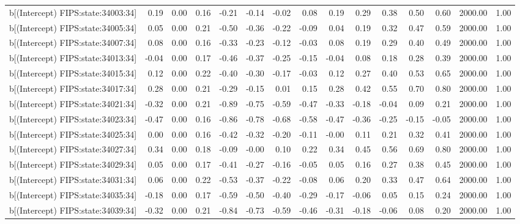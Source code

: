 \begin{table}[ht]
\begin{tabular}{rrrrrrrrrrrrrrr}
  b[(Intercept) FIPS:state:34003:34] & 0.19 & 0.00 & 0.16 & -0.21 & -0.14 & -0.02 & 0.08 & 0.19 & 0.29 & 0.38 & 0.50 & 0.60 & 2000.00 & 1.00 \\ 
  b[(Intercept) FIPS:state:34005:34] & 0.05 & 0.00 & 0.21 & -0.50 & -0.36 & -0.22 & -0.09 & 0.04 & 0.19 & 0.32 & 0.47 & 0.59 & 2000.00 & 1.00 \\ 
  b[(Intercept) FIPS:state:34007:34] & 0.08 & 0.00 & 0.16 & -0.33 & -0.23 & -0.12 & -0.03 & 0.08 & 0.19 & 0.29 & 0.40 & 0.49 & 2000.00 & 1.00 \\ 
  b[(Intercept) FIPS:state:34013:34] & -0.04 & 0.00 & 0.17 & -0.46 & -0.37 & -0.25 & -0.15 & -0.04 & 0.08 & 0.18 & 0.28 & 0.39 & 2000.00 & 1.00 \\ 
  b[(Intercept) FIPS:state:34015:34] & 0.12 & 0.00 & 0.22 & -0.40 & -0.30 & -0.17 & -0.03 & 0.12 & 0.27 & 0.40 & 0.53 & 0.65 & 2000.00 & 1.00 \\ 
  b[(Intercept) FIPS:state:34017:34] & 0.28 & 0.00 & 0.21 & -0.29 & -0.15 & 0.01 & 0.15 & 0.28 & 0.42 & 0.55 & 0.70 & 0.80 & 2000.00 & 1.00 \\ 
  b[(Intercept) FIPS:state:34021:34] & -0.32 & 0.00 & 0.21 & -0.89 & -0.75 & -0.59 & -0.47 & -0.33 & -0.18 & -0.04 & 0.09 & 0.21 & 2000.00 & 1.00 \\ 
  b[(Intercept) FIPS:state:34023:34] & -0.47 & 0.00 & 0.16 & -0.86 & -0.78 & -0.68 & -0.58 & -0.47 & -0.36 & -0.25 & -0.15 & -0.05 & 2000.00 & 1.00 \\ 
  b[(Intercept) FIPS:state:34025:34] & 0.00 & 0.00 & 0.16 & -0.42 & -0.32 & -0.20 & -0.11 & -0.00 & 0.11 & 0.21 & 0.32 & 0.41 & 2000.00 & 1.00 \\ 
  b[(Intercept) FIPS:state:34027:34] & 0.34 & 0.00 & 0.18 & -0.09 & -0.00 & 0.10 & 0.22 & 0.34 & 0.45 & 0.56 & 0.69 & 0.80 & 2000.00 & 1.00 \\ 
  b[(Intercept) FIPS:state:34029:34] & 0.05 & 0.00 & 0.17 & -0.41 & -0.27 & -0.16 & -0.05 & 0.05 & 0.16 & 0.27 & 0.38 & 0.45 & 2000.00 & 1.00 \\ 
  b[(Intercept) FIPS:state:34031:34] & 0.06 & 0.00 & 0.22 & -0.53 & -0.37 & -0.22 & -0.08 & 0.06 & 0.20 & 0.33 & 0.47 & 0.64 & 2000.00 & 1.00 \\ 
  b[(Intercept) FIPS:state:34035:34] & -0.18 & 0.00 & 0.17 & -0.59 & -0.50 & -0.40 & -0.29 & -0.17 & -0.06 & 0.05 & 0.15 & 0.24 & 2000.00 & 1.00 \\ 
  b[(Intercept) FIPS:state:34039:34] & -0.32 & 0.00 & 0.21 & -0.84 & -0.73 & -0.59 & -0.46 & -0.31 & -0.18 & -0.06 & 0.08 & 0.20 & 2000.00 & 1.00 \\ 

\end{tabular}
\end{table}
